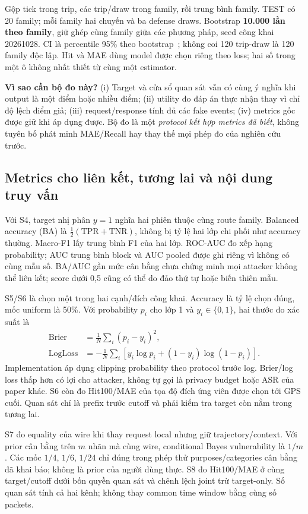 Gộp tick trong trip, các trip/draw trong family, rồi trung bình family. TEST có 20 family; mỗi family hai
chuyến và ba defense draws. Bootstrap \textbf{10.000 lần theo family}, giữ ghép cùng family giữa các phương pháp,
seed công khai 20261028. CI là percentile 95\% theo bootstrap~\cite{efron}; không coi 120 trip-draw là 120 family độc lập.
Hit và MAE dùng model được chọn riêng theo loss; hai số trong một ô không nhất thiết từ cùng một estimator.

\textbf{Vì sao cần bộ đo này?} (i) Target và cửa sổ quan sát vẫn có cùng ý nghĩa khi output là một điểm hoặc
nhiều điểm; (ii) utility đo đáp án thực nhận thay vì chỉ độ lệch điểm giả; (iii) request/response tính đủ các
fake events; (iv) metrics gốc được giữ khi áp dụng được. Bộ đo là một \emph{protocol kết hợp metrics đã biết},
không tuyên bố phát minh MAE/Recall hay thay thế mọi phép đo của nghiên cứu trước.

\subsection{Metrics cho liên kết, tương lai và nội dung truy vấn}
Với S4, target nhị phân $y=1$ nghĩa hai phiên thuộc cùng route family. Balanced accuracy (BA) là
$\frac12(\mathrm{TPR}+\mathrm{TNR})$, không bị tỷ lệ hai lớp chi phối như accuracy thường. Macro-F1
lấy trung bình F1 của hai lớp. ROC-AUC đo xếp hạng probability; AUC trung bình block và AUC pooled
được ghi riêng vì không có cùng mẫu số. BA/AUC gần mức cân bằng chưa chứng minh mọi attacker không
thể liên kết; score dưới 0,5 cũng có thể do đảo thứ tự hoặc biến thiên mẫu.

S5/S6 là chọn một trong hai cạnh/đích công khai. Accuracy là tỷ lệ chọn đúng, mốc uniform là 50\%.
Với probability $p_i$ cho lớp 1 và $y_i\in\{0,1\}$, hai thước đo xác suất là
\begin{align}
\operatorname{Brier}&=\frac1N\sum_i(p_i-y_i)^2,\label{eq:brier}\\
\operatorname{LogLoss}&=-\frac1N\sum_i[y_i\log p_i+(1-y_i)\log(1-p_i)].\label{eq:logloss}
\end{align}
Implementation áp dụng clipping probability theo protocol trước log. Brier/log loss thấp hơn có
lợi cho attacker, không tự gọi là privacy budget hoặc ASR của paper khác. S6 còn đo Hit100/MAE
của tọa độ đích ứng viên được chọn tới GPS cuối. Quan sát chỉ là prefix trước cutoff và phải kiểm
tra target còn nằm trong tương lai.

S7 đo equality của wire khi thay request local nhưng giữ trajectory/context. Với prior cân bằng trên
$m$ nhãn mà cùng wire, conditional Bayes vulnerability là $1/m$. Các mốc $1/4$, $1/6$, $1/24$ chỉ
đúng trong phép thử purposes/categories cân bằng đã khai báo; không là prior của người dùng thực.
S8 đo Hit100/MAE ở cùng target/cutoff dưới bốn quyền quan sát và chênh lệch joint trừ target-only.
Số quan sát tính cả hai kênh; không thay common time window bằng cùng số packets.

